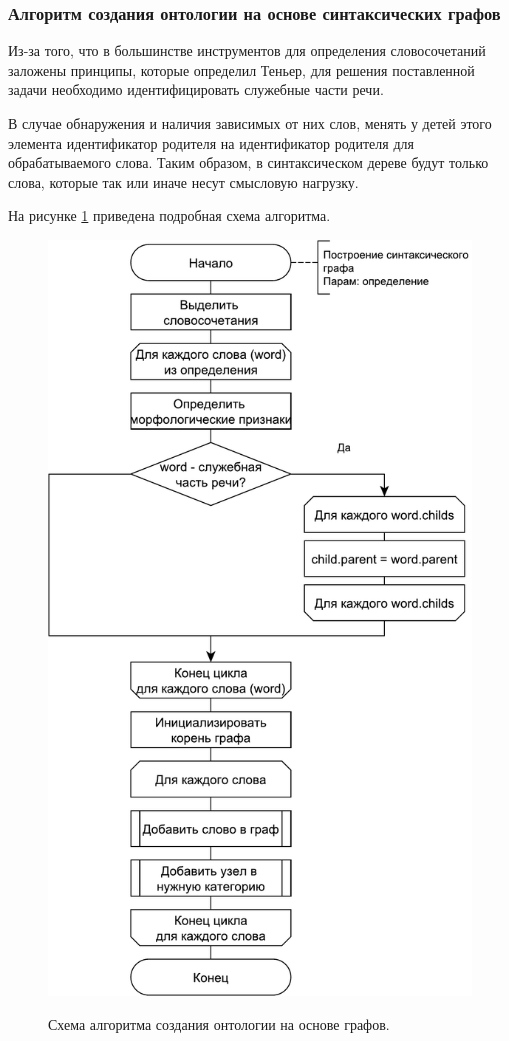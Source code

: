 \subsubsection{Алгоритм создания онтологии на основе синтаксических графов}
Из-за того, что в большинстве инструментов для определения словосочетаний заложены принципы, которые определил Теньер, для решения поставленной задачи необходимо идентифицировать служебные части речи. 

В случае обнаружения и наличия зависимых от них слов, менять у детей этого элемента идентификатор родителя на идентификатор родителя для обрабатываемого слова. Таким образом, в синтаксическом дереве будут только слова, которые так или иначе несут смысловую нагрузку. 

На рисунке \ref{fig30:image} приведена подробная схема алгоритма.
\begin{figure}[h]
	\begin{center}
		{\includegraphics[scale = 0.6]{img/schemes/pdf/graph.pdf}}
		\caption{Схема алгоритма создания онтологии на основе графов.}
		\label{fig30:image}
	\end{center}
\end{figure}

